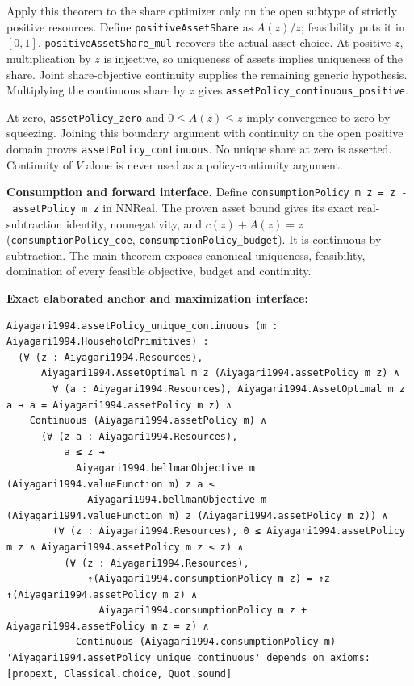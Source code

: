 \documentclass[
  11pt,
]{article}
\let\LedgerOriginalTexttt\texttt
\renewcommand{\texttt}[1]{{\small\LedgerOriginalTexttt{#1}}}
\begin{document}
Apply this theorem to the share optimizer only on the open subtype of
strictly positive resources. Define \texttt{positiveAssetShare} as
\(A(z)/z\); feasibility puts it in \([0,1]\).
\texttt{positiveAssetShare\_mul} recovers the actual asset choice. At
positive \(z\), multiplication by \(z\) is injective, so uniqueness of
assets implies uniqueness of the share. Joint share-objective continuity
supplies the remaining generic hypothesis. Multiplying the continuous
share by \(z\) gives \texttt{assetPolicy\_continuous\_positive}.

At zero, \texttt{assetPolicy\_zero} and \(0\leq A(z)\leq z\) imply
convergence to zero by squeezing. Joining this boundary argument with
continuity on the open positive domain proves
\texttt{assetPolicy\_continuous}. No unique share at zero is asserted.
Continuity of \(V\) alone is never used as a policy-continuity argument.

\textbf{Consumption and forward interface.} Define
\texttt{consumptionPolicy\ m\ z\ =\ z\ -\ assetPolicy\ m\ z} in NNReal.
The proven asset bound gives its exact real-subtraction identity,
nonnegativity, and \(c(z)+A(z)=z\) (\texttt{consumptionPolicy\_coe},
\texttt{consumptionPolicy\_budget}). It is continuous by subtraction.
The main theorem exposes canonical uniqueness, feasibility, domination
of every feasible objective, budget and continuity.

\textbf{Exact elaborated anchor and maximization interface:}

\begin{verbatim}
Aiyagari1994.assetPolicy_unique_continuous (m : Aiyagari1994.HouseholdPrimitives) :
  (∀ (z : Aiyagari1994.Resources),
      Aiyagari1994.AssetOptimal m z (Aiyagari1994.assetPolicy m z) ∧
        ∀ (a : Aiyagari1994.Resources), Aiyagari1994.AssetOptimal m z a → a = Aiyagari1994.assetPolicy m z) ∧
    Continuous (Aiyagari1994.assetPolicy m) ∧
      (∀ (z a : Aiyagari1994.Resources),
          a ≤ z →
            Aiyagari1994.bellmanObjective m (Aiyagari1994.valueFunction m) z a ≤
              Aiyagari1994.bellmanObjective m (Aiyagari1994.valueFunction m) z (Aiyagari1994.assetPolicy m z)) ∧
        (∀ (z : Aiyagari1994.Resources), 0 ≤ Aiyagari1994.assetPolicy m z ∧ Aiyagari1994.assetPolicy m z ≤ z) ∧
          (∀ (z : Aiyagari1994.Resources),
              ↑(Aiyagari1994.consumptionPolicy m z) = ↑z - ↑(Aiyagari1994.assetPolicy m z) ∧
                Aiyagari1994.consumptionPolicy m z + Aiyagari1994.assetPolicy m z = z) ∧
            Continuous (Aiyagari1994.consumptionPolicy m)
'Aiyagari1994.assetPolicy_unique_continuous' depends on axioms: [propext, Classical.choice, Quot.sound]
\end{verbatim}
\end{document}
